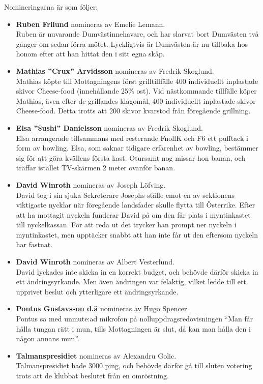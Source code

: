 \documentclass[hidelinks]{../sektionsmote} %
\begin{document}
\noindent Nomineringarna är som följer:
\begin{itemize}
\item \textbf{Ruben Frilund} nomineras av Emelie Lemann.\\
Ruben är nuvarande Dumvästinnehavare, och har slarvat bort Dumvästen två gånger om sedan förra mötet.
Lyckligtvis är Dumvästen är nu tillbaka hos honom efter att han hittat den i sitt egna skåp.

\item \textbf{Mathias ''Crux'' Arvidsson} nomineras av Fredrik Skoglund.\\
Mathias köpte till Mottagningens först grilltillfälle 400 individuellt inplastade skivor Cheese-food (innehållande 25\% ost).
Vid nästkommande tillfälle köper Mathias, även efter de grillandes klagomål, 400 individuellt inplastade skivor Cheese-food.
Detta trotts att 200 skivor kvarstod från föregående grillning.

\item \textbf{Elsa ''\$ushi'' Danielsson} nomineras av Fredrik Skoglund.\\
Elsa arrangerade tillsammans med resterande FnollK och F6 ett pufftack i form av bowling.
Elsa, som saknar tidigare erfarenhet av bowling, bestämmer sig för att göra kvällens första kast.
Otursamt nog missar hon banan, och träffar istället TV-skärmen 2 meter ovanför banan.

\item \textbf{David Winroth} nomineras av Joseph Löfving.\\
David tog i sin sjuka Sekreterare Josephs ställe emot en av sektionens viktigaste nycklar när föregående landsfader skulle flytta till Österrike.
Efter att ha mottagit nyckeln funderar David på om den får plats i myntinkastet till nyckelkassan.
För att reda ut det trycker han prompt ner nyckeln i myntinkastet, men upptäcker snabbt att han inte får ut den eftersom nyckeln har fastnat.

\item \textbf{David Winroth} nomineras av Albert Vesterlund.\\
David lyckades inte skicka in en korrekt budget, och behövde därför skicka in ett ändringsyrkande.
Men även ändringen var felaktig, vilket ledde till ett upprivet beslut och ytterligare ett ändringsyrkande.

\item \textbf{Pontus Gustavsson d.ä} nomineras av Hugo Spencer.\\
Pontus sa med unmute:ad mikrofon på nolluppdragsredovisningen \enquote{Man får hålla tungan rätt i mun, tills Mottagningen är slut, då kan man hålla den i någon annans mun}.

\item \textbf{Talmanspresidiet} nomineras av Alexandru Golic.\\
Talmanspresidiet hade 3000 ping, och behövde därför gå till sluten votering trots att de klubbat beslutet från en omröstning.
\end{itemize}
\end{document}

